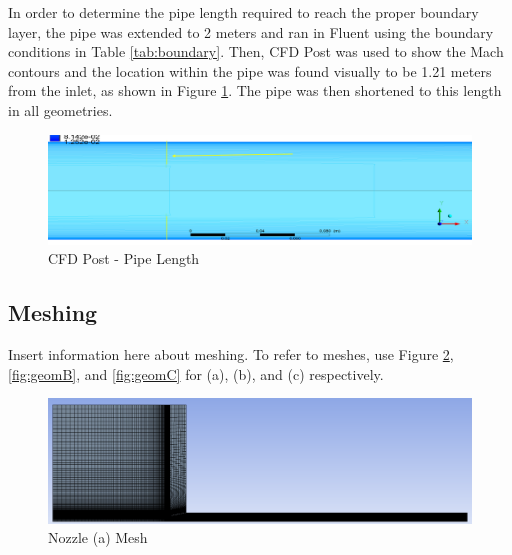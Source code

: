 \documentclass[12pt]{article} %
\begin{document}
In order to determine the pipe length required to reach the proper boundary layer, the pipe was extended to 2 meters and ran in Fluent using the boundary conditions in Table \ref{tab:boundary}. Then, CFD Post was used to show the Mach contours and the location within the pipe was found visually to be 1.21 meters from the inlet, as shown in Figure \ref{fig:boundarylength}. The pipe was then shortened to this length in all geometries.

\begin{figure}[ht]
    \centering
    \includegraphics[width = \linewidth]{BoundaryLength.PNG}
    \caption{CFD Post - Pipe Length}
    \label{fig:boundarylength}
\end{figure}

\subsection{Meshing}\label{section:mesh}
Insert information here about meshing. To refer to meshes, use Figure \ref{fig:geomA}, \ref{fig:geomB}, and \ref{fig:geomC} for (a), (b), and (c) respectively.

\begin{figure}[ht]
    \centering
    \includegraphics[width = \linewidth]{NozzleA_Mesh.PNG}
    \caption{Nozzle (a) Mesh}
    \label{fig:geomA}
\end{figure}


\end{document}
